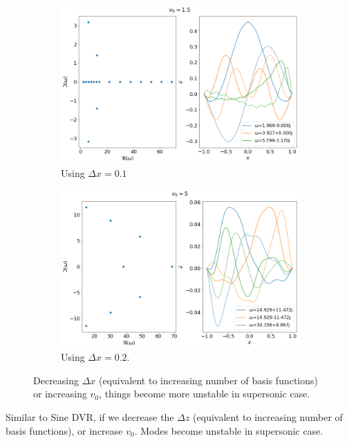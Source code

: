 \documentclass{article}
\begin{document}
\begin{figure}[H]
    \centering
    \begin{subfigure}[b]{0.45\linewidth}
        \includegraphics[width=\linewidth]{img/results-sinc-dvr-dx=0.1,v0=1.5.png}
        \caption{Using $\Delta x=0.1$}
    \end{subfigure}%
    \begin{subfigure}[b]{0.45\linewidth}
        \includegraphics[width=\linewidth]{img/results-sinc-dvr-dx=0.2,v0=5.png}
        \caption{Using $\Delta x=0.2$.}
    \end{subfigure}
    \caption{Decreasing $\Delta x$ (equivalent to increasing number of basis functions) or increasing $v_0$, things become more unstable in supersonic case.}
    \label{fig:results-sinc-dvr-unstable}
\end{figure}

Similar to Sine DVR, if we decrease the $\Delta z$ (equivalent to increasing number of basis functions), or increase $v_0$. Modes become unstable in supersonic case. 
\end{document}
